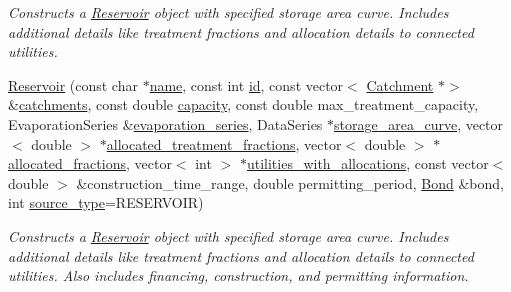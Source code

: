 \begin{DoxyCompactItemize}
\begin{DoxyCompactList}\small\item\em Constructs a \mbox{\hyperlink{classReservoir}{Reservoir}} object with specified storage area curve. Includes additional details like treatment fractions and allocation details to connected utilities. \end{DoxyCompactList}\item 
\mbox{\hyperlink{classReservoir_ac20659043afad4d2df49ce91e08f5dad}{Reservoir}} (const char $\ast$\mbox{\hyperlink{classWaterSource_a846ea74c5b453d014f594d41fee8c765}{name}}, const int \mbox{\hyperlink{classWaterSource_a6eafe5dfefd317877d1244e8a7c6e742}{id}}, const vector$<$ \mbox{\hyperlink{classCatchment}{Catchment}} $\ast$$>$ \&\mbox{\hyperlink{classWaterSource_a8c18c34f23f8a06685c1d12f462ed830}{catchments}}, const double \mbox{\hyperlink{classWaterSource_a2ec257b415b248214a8bce7fc5267723}{capacity}}, const double max\+\_\+treatment\+\_\+capacity, Evaporation\+Series \&\mbox{\hyperlink{classReservoir_a2d2d9b302c13703309bb798d24136810}{evaporation\+\_\+series}}, Data\+Series $\ast$\mbox{\hyperlink{classReservoir_a46bd5b750963dfa9a57b247fd77ab8ff}{storage\+\_\+area\+\_\+curve}}, vector$<$ double $>$ $\ast$\mbox{\hyperlink{classWaterSource_aa73fe10cfc6579b2fb79529e1dde5140}{allocated\+\_\+treatment\+\_\+fractions}}, vector$<$ double $>$ $\ast$\mbox{\hyperlink{classWaterSource_a2f6655a80c4847fe039987255d9d998c}{allocated\+\_\+fractions}}, vector$<$ int $>$ $\ast$\mbox{\hyperlink{classWaterSource_ac345583fc2d0f7e1db31ee40244d7ace}{utilities\+\_\+with\+\_\+allocations}}, const vector$<$ double $>$ \&construction\+\_\+time\+\_\+range, double permitting\+\_\+period, \mbox{\hyperlink{classBond}{Bond}} \&bond, int \mbox{\hyperlink{classWaterSource_afdd12c29fc74ea21dff1f1be9b8c2b7b}{source\+\_\+type}}=R\+E\+S\+E\+R\+V\+O\+IR)
\begin{DoxyCompactList}\small\item\em Constructs a \mbox{\hyperlink{classReservoir}{Reservoir}} object with specified storage area curve. Includes additional details like treatment fractions and allocation details to connected utilities. Also includes financing, construction, and permitting information. \end{DoxyCompactList}\item 
$$
\end{DoxyCompactItemize}
